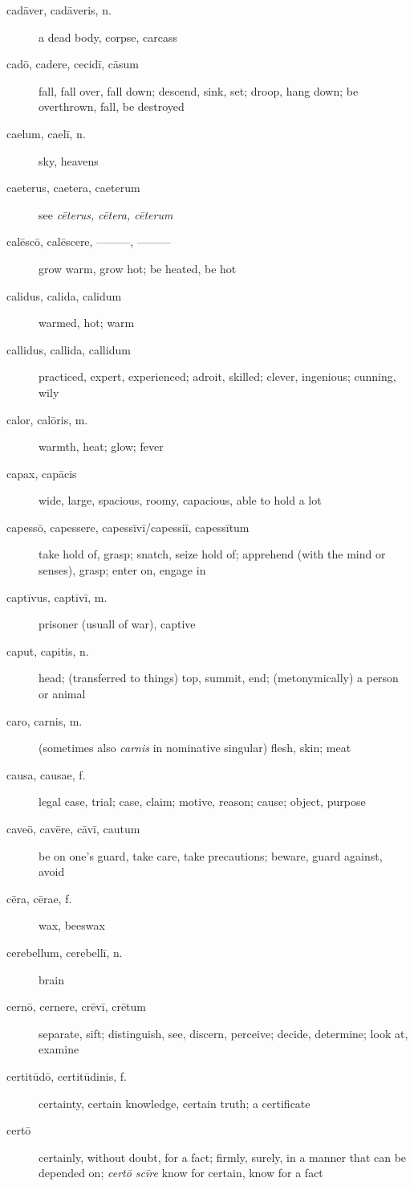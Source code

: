 \begin{description}
    \item[cadāver, cadāveris, n.] a dead body, corpse, carcass
    \item[cadō, cadere, cecidī, cāsum] \marginnote{*}fall, fall over, fall down; descend, sink, set; droop, hang down; be overthrown, fall, be destroyed
    \item[caelum, caelī, n.] \marginnote{*} sky, heavens
    \item[caeterus, caetera, caeterum] see \textit{cēterus, cētera, cēterum}
    \item[calēscō, calēscere, ———, ———] grow warm, grow hot; be heated, be hot
    \item[calidus, calida, calidum] warmed, hot; warm
    \item[callidus, callida, callidum] practiced, expert, experienced; adroit, skilled; clever, ingenious; cunning, wily
    \item[calor, calōris, m.] warmth, heat; glow; fever
    \item[capax, capācis] wide, large, spacious, roomy, capacious, able to hold a lot
    \item[capessō, capessere, capessīvī/capessiī, capessītum] take hold of, grasp; snatch, seize hold of; apprehend (with the mind or senses), grasp; enter on, engage in
    \item[captīvus, captīvī, m.] prisoner (usuall of war), captive
    \item[caput, capitis, n.] \marginnote{*}head; (transferred to things) top, summit, end; (metonymically) a person or animal
    \item[caro, carnis, m.] (sometimes also \textit{carnis} in nominative singular) flesh, skin; meat
    \item[causa, causae, f.] \marginnote{*}legal case, trial; case, claim; motive, reason; cause; object, purpose
    \item[caveō, cavēre, cāvī, cautum] \marginnote{*}be on one's guard, take care, take precautions; beware, guard against, avoid
    \item[cēra, cērae, f.] wax, beeswax
    \item[cerebellum, cerebellī, n.] brain
    \item[cernō, cernere, crēvī, crētum] \marginnote{*}separate, sift; distinguish, see, discern, perceive; decide, determine; look at, examine
    \item[certitūdō, certitūdinis, f.] certainty, certain knowledge, certain truth; a certificate
    \item[certō] certainly, without doubt, for a fact; firmly, surely, in a manner that can be depended on; \textit{certō scīre} know for certain, know for a fact

\end{description}
